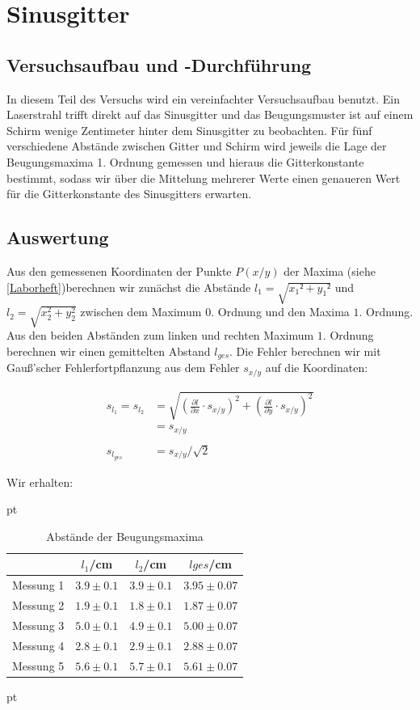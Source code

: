 \documentclass[12pt]{article}
\newcommand{\del}[2][]{\frac{\partial #1}{\partial #2}}
\begin{document}
\newpage

\section{Sinusgitter}



\subsection{Versuchsaufbau und -Durchführung}

In diesem Teil des Versuchs wird ein vereinfachter Versuchsaufbau benutzt. Ein Laserstrahl trifft direkt auf das Sinusgitter und das Beugungsmuster ist auf einem Schirm wenige Zentimeter hinter dem Sinusgitter zu beobachten. Für fünf verschiedene Abstände zwischen Gitter und Schirm wird jeweils die Lage der Beugungsmaxima 1. Ordnung gemessen und hieraus die Gitterkonstante bestimmt, sodass wir über die Mittelung mehrerer Werte einen genaueren Wert für die Gitterkonstante des Sinusgitters erwarten.


\subsection{Auswertung}

Aus den gemessenen Koordinaten der Punkte $P(x/y)$ der Maxima (siehe \ref{Laborheft})berechnen wir zunächst die Abstände $l_1 = \sqrt{x_1²+y_1²}$ und $l_2= \sqrt{x_2^2+y_2^2} $ zwischen dem Maximum $0.$ Ordnung und den Maxima $1.$ Ordnung. Aus den beiden Abständen zum linken und rechten Maximum $1.$ Ordnung berechnen wir einen gemittelten Abstand $l_{ges}$. Die Fehler berechnen wir mit Gauß'scher Fehlerfortpflanzung aus dem Fehler $s_{x/y}$ auf die Koordinaten:

\begin{align*}
s_{l_1} = s_{l_2} &= \sqrt{\left(\del[l]{x}\cdot s_{x/y}\right)^2+\left(\del[l]{y}\cdot s_{x/y}\right)^2}\\
&= s_{x/y}\\
\  \\
s_{l_{ges}} &= s_{x/y}/\sqrt{2}
\end{align*}

Wir erhalten:

  pt
 \begin{table}[h!]
 {\centering{}
\begin{tabular}{c||c|c|c}
 					& $l_1$/cm 	& $l_2$/cm & $l{ges}$/cm 	\\ \hline\hline
Messung 1		& $3.9 \pm 0.1$ 	&  $3.9 \pm 0.1$    	&  $3.95 \pm 0.07$ \\ \hline 
Messung 2	&	 $1.9 \pm 0.1$ 	   	&  $1.8 \pm 0.1$  	&  $1.87 \pm 0.07$  \\ \hline
Messung 3      	&  $5.0 \pm 0.1$  	&  $4.9 \pm 0.1$  &  $5.00 \pm 0.07$  \\ \hline
Messung 4    & $2.8 \pm 0.1$ & $2.9 \pm 0.1$ &   $2.88 \pm 0.07$        \\ \hline                                           
Messung 5  & $5.6 \pm 0.1$  & $5.7 \pm 0.1$ & $5.61 \pm 0.07$
 \end{tabular}
 \caption{Abstände der Beugungsmaxima}}
\end{table}
 pt
\end{document}
